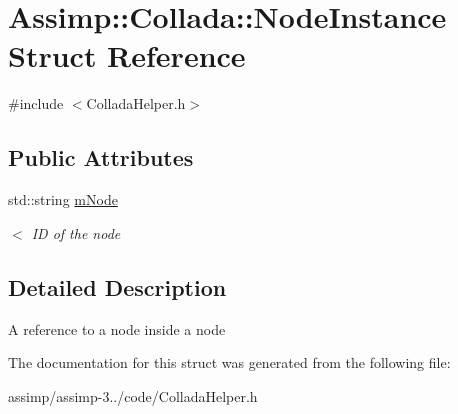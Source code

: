 \hypertarget{struct_assimp_1_1_collada_1_1_node_instance}{\section{Assimp\+:\+:Collada\+:\+:Node\+Instance Struct Reference}
\label{struct_assimp_1_1_collada_1_1_node_instance}
}


{\ttfamily \#include $<$Collada\+Helper.\+h$>$}

\subsection*{Public Attributes}
\begin{DoxyCompactItemize}
\item 
\hypertarget{struct_assimp_1_1_collada_1_1_node_instance_aaf95f1490274c847b62779806ed450b3}{std\+::string \hyperlink{struct_assimp_1_1_collada_1_1_node_instance_aaf95f1490274c847b62779806ed450b3}{m\+Node}}\label{struct_assimp_1_1_collada_1_1_node_instance_aaf95f1490274c847b62779806ed450b3}

\begin{DoxyCompactList}\small\item\em $<$ I\+D of the node \end{DoxyCompactList}\end{DoxyCompactItemize}


\subsection{Detailed Description}
A reference to a node inside a node 

The documentation for this struct was generated from the following file\+:\begin{DoxyCompactItemize}
\item 
assimp/assimp-\/3../code/Collada\+Helper.\+h\end{DoxyCompactItemize}
